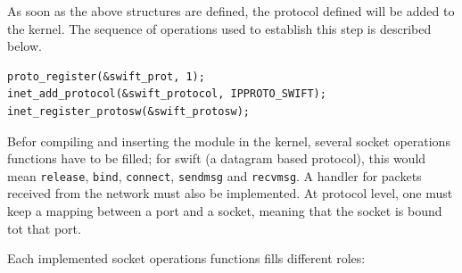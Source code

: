 As soon as the above structures are defined, the protocol defined will be
added to the kernel. The sequence of operations used to establish this step is
described below.

\begin{verbatim}
proto_register(&swift_prot, 1);
inet_add_protocol(&swift_protocol, IPPROTO_SWIFT);
inet_register_protosw(&swift_protosw);
\end{verbatim}

Befor compiling and inserting the module in the kernel, several socket
operations functions have to be filled; for swift (a datagram based protocol),
this would mean \texttt{release}, \texttt{bind}, \texttt{connect},
\texttt{sendmsg} and \texttt{recvmsg}. A handler for packets received from the
network must also be implemented. At protocol level, one must keep a mapping
between a port and a socket, meaning that the socket is bound tot that port.

Each implemented socket operations functions fills different roles:

